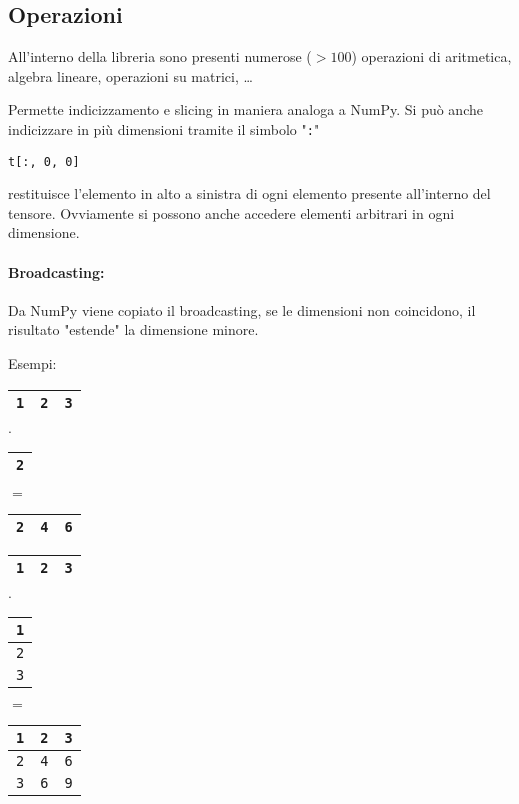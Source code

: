\subsection{Operazioni}

All'interno della libreria sono presenti numerose ($> 100$) operazioni di aritmetica, algebra lineare, operazioni su matrici, \dots

Permette indicizzamento e slicing in maniera analoga a NumPy. Si può anche indicizzare in più dimensioni tramite il simbolo "\texttt{:}"
\begin{verbatim}
t[:, 0, 0]
\end{verbatim}
restituisce l'elemento in alto a sinistra di ogni elemento presente all'interno del tensore. Ovviamente si possono anche accedere elementi arbitrari in ogni dimensione.

\paragraph{Broadcasting:} Da NumPy viene copiato il broadcasting, se le dimensioni non coincidono, il risultato "estende" la dimensione minore. 

Esempi:
\begin{center}
    \begin{tabular}{| c | c | c |}
        \hline 
        \texttt{1} & \texttt{2} & \texttt{3} \\
        \hline
    \end{tabular}
    $\cdot$
    \begin{tabular}{| c |}
        \hline
        \texttt{2} \\
        \hline 
    \end{tabular}
    $=$ 
    \begin{tabular}{| c | c | c |}
        \hline
        \texttt{2} & \texttt{4} & \texttt{6} \\
        \hline
    \end{tabular}
\end{center}

\begin{center}
    \begin{tabular}{| c | c | c |}
        \hline
        \texttt{1} & \texttt{2} & \texttt{3} \\
        \hline
    \end{tabular}
    $\cdot$
    \begin{tabular}{| c |}
        \hline
        \texttt{1} \\
        \hline
        \texttt{2} \\
        \hline 
        \texttt{3} \\
        \hline
    \end{tabular}
    $=$
    \begin{tabular}{| c | c | c |}
        \hline
        \texttt{1} & \texttt{2} & \texttt{3} \\
        \hline
        \texttt{2} & \texttt{4} & \texttt{6} \\
        \hline
        \texttt{3} & \texttt{6} & \texttt{9} \\
        \hline
    \end{tabular}
\end{center}

